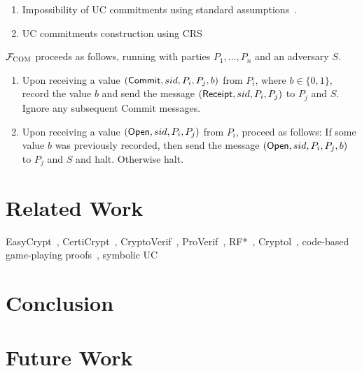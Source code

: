 \documentclass[acmsmall,review,anonymous]{acmart}\settopmatter{printfolios=true,printccs=false,printacmref=false}
\begin{document}


\begin{enumerate}
\item Impossibility of UC commitments using standard
assumptions~\cite{canetti2001commitments}.
\item UC commitments construction using CRS
\end{enumerate}

\begin{func}[COM]
    $\mathcal{F}_{\textsc{COM}}$ proceeds as follows, running with parties $P_1, \ldots, P_n$ and an adversary $S$.
    \begin{enumerate}
        \item Upon receiving a value $({\sf Commit}, sid, P_i, P_j, b)$ from
          $P_i$, where $b \in \{ 0, 1 \}$, record the value $b$ and send the
          message $({\sf Receipt}, sid, P_i, P_j)$ to $P_j$ and $S$. Ignore any
          subsequent {\sf Commit} messages.

        \item Upon receiving a value $({\sf Open}, sid, P_i, P_j)$ from $P_i$,
          proceed as follows: If some value $b$ was previously recorded, then
          send the message $({\sf Open}, sid, P_i, P_j, b)$ to $P_j$ and $S$ and halt. Otherwise halt.
    \end{enumerate}
\end{func}



\section{Related Work}
EasyCrypt~\cite{barthe2011computer}, CertiCrypt~\cite{barthe2009formal},
CryptoVerif~\cite{blanchet2007cryptoverif},
ProVerif~\cite{blanchet2005proverif}, RF*~\cite{barthe2014probabilistic},
Cryptol~\cite{lewis2003cryptol}, code-based game-playing
proofs~\cite{bellare2006security}, symbolic UC~\cite{bohl2016symbolic}
\section{Conclusion}

\section{Future Work}
\end{document}
